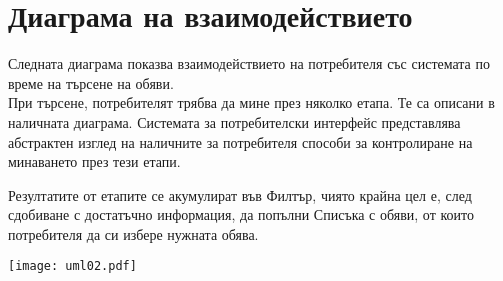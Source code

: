\documentclass[a4paper,12pt]{article}
\begin{document}
\newpage

\section{Диаграма на взаимодействието}

Следната диаграма показва взаимодействието на потребителя със системата по време на търсене на обяви. \\

При търсене, потребителят трябва да мине през няколко етапа.  Те са описани в
наличната диаграма.  Системата за потребителски интерфейс представлява 
абстрактен изглед на наличните за потребителя способи за контролиране на
минаването през тези етапи.

Резултатите от етапите се акумулират във Филтър, чиято крайна цел е, след
сдобиване с достатъчно информация, да попълни Списъка с обяви, от които
потребителя да си избере нужната обява.

\texttt{[image: uml02.pdf]}
\end{document}
